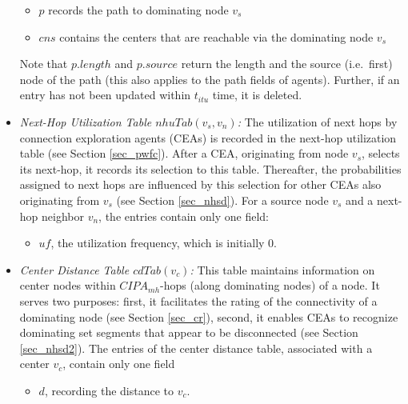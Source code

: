 \begin{itemize}
\begin{itemize}
 \item $p$ records the path to dominating node $v_s$
 
 \item $cns$ contains the centers that are reachable via the dominating node $v_s$

\end{itemize}
 
Note that $p.length$ and $p.source$ return the length and the source (i.e.\ first) node of the path (this also applies to the path fields of agents). Further, if an entry has not been updated within $t_{itu}$ time, it is deleted.
		
\item \emph{Next-Hop Utilization Table $nhuTab(v_{s}, v_{n})$:} The utilization of next hops by connection exploration agents (CEAs) is recorded in the next-hop utilization table (see Section \ref{sec_pwfc}). After a CEA, originating from node $v_s$, selects its next-hop, it records its selection to this table. Thereafter, the probabilities assigned to next hops are influenced by this selection for other CEAs also originating from $v_s$ (see Section \ref{sec_nhsd}).  For a source node $v_s$ and a next-hop neighbor $v_n$, the entries contain only one field: 

\begin{itemize}

\item $uf$, the utilization frequency, which is initially $0$.

\end{itemize}

\item \emph{Center Distance Table $cdTab(v_c)$:} This table maintains information on center nodes within $CIPA_{mh}$-hops (along dominating nodes) of a node. It serves two purposes: first, it facilitates the rating of the connectivity of a dominating node (see Section \ref{sec_cr}), second, it enables CEAs to recognize dominating set segments that appear to be disconnected (see Section \ref{sec_nhsd2}). The entries of the center distance table, associated with a center $v_c$, contain only one field

\begin{itemize}

	\item $d$, recording the distance to $v_c$.
	
\end{itemize}

\end{itemize}


